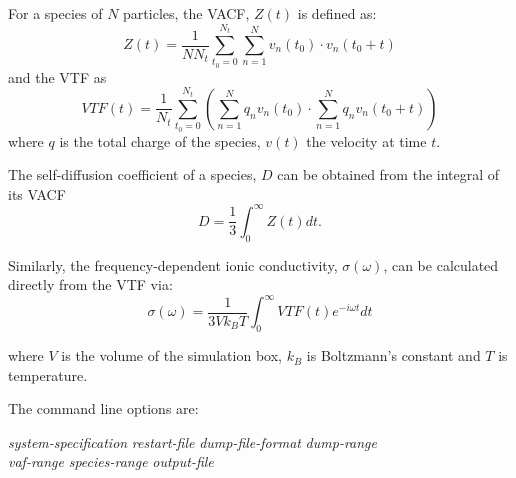 \documentclass[a4paper,twoside]{report}
\begin{document}
For a species of $N$ particles, the VACF, $Z(t)$ is defined as:
\begin{equation}
  Z(t) = \frac{1}{N N_t} \sum_{t_0=0}^{N_t} \sum_{n=1}^N v_n(t_0) \cdot v_n(t_0 + t)
\end{equation}
and the VTF as
\begin{equation}
  VTF(t)= \frac{1}{N_t} \sum_{t_0=0}^{N_t} \left ( \sum_{n=1}^N q_n v_n(t_0) 
  \cdot  \sum_{n=1}^N  q_n v_n(t_0 + t) \right )
\end{equation}
where $q$ is the total charge of the species, $v(t)$ the
velocity at time $t$.

The self-diffusion coefficient of a species, $D$ can be
obtained from the integral of its VACF
\begin{equation}
  D = \frac{1}{3} \int_0^\infty Z(t) dt .
\end{equation}

Similarly, the frequency-dependent ionic conductivity, $\sigma(\omega)$, can
be calculated directly from the VTF via:
\begin{equation}
  \sigma(\omega) = \frac{1}{3 V k_B T}    \int_0^\infty VTF(t) e^{-i \omega t} dt
\end{equation}

where $V$ is the volume of the simulation box, $k_{B}$ is Boltzmann's
constant and $T$ is temperature.

The command line options are:

\begin{center}
\Lit{[-s} \textit{system-specification} \Lit{|}
 \textit{restart-file} \Lit{]}
\Lit{[-d} \textit{dump-file-format}\Lit{]}
\Lit{[-t} \textit{dump-range}\Lit{]} \\
\Lit{[-v} \textit{vaf-range}\Lit{]}
\Lit{[-g} \textit{species-range}\Lit{]} 
\Lit{[-c]}
\Lit{[-q]} 
\Lit{[-o} \textit{output-file}\Lit{]}
\end{center}
\end{document}
